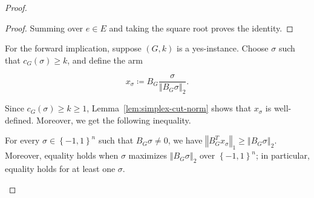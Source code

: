 {\begin{proof}
\begin{proof}
Summing over $e \in E$ and taking the square root proves the identity.
\end{proof}

For the forward implication, suppose $\left( G , k \right)$ is a yes-instance. Choose
$\sigma$ such that $c_{G} \left( \sigma \right) \ge k$, and define the arm


\begin{equation*}
x_{\sigma} \coloneqq B_{G} \frac{\sigma}{{\left\Vert B_{G} \sigma \right\Vert}_{2}} .
\end{equation*}


Since $c_{G} \left( \sigma \right) \ge k \ge 1$, Lemma~\ref{lem:simplex-cut-norm} shows that $x_{\sigma}$ is
well-defined. Moreover, we get the following inequality.


\begin{lemma}\label{lem:simplex-duality}

  For every $\sigma \in {\left\{ - 1 , 1 \right\}}^{n}$ such that $B_{G} \sigma \ne 0$, we have
  ${\left\Vert B_{G}^{T} x_{\sigma} \right\Vert}_{1} \ge {\left\Vert B_{G} \sigma \right\Vert}_{2}$. Moreover, equality holds when
  $\sigma$ maximizes ${\left\Vert B_{G} \sigma \right\Vert}_{2}$ over ${\left\{ - 1 , 1 \right\}}^{n}$; in particular,
  equality holds for at least one $\sigma$.

\end{lemma}


\end{proof}}
